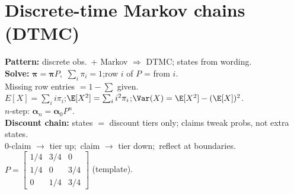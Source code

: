 \section*{Discrete-time Markov chains (DTMC)}
\textbf{Pattern:} discrete obs.\ + Markov $\Rightarrow$ DTMC; states from wording.\\
\textbf{Solve:} $\boldsymbol{\pi}=\boldsymbol{\pi}P$,\ $\sum_i\pi_i=1$;\quad row $i$ of $P$ = from $i$.\\
Missing row entries $=1-\sum$ given.\\
$E[X]=\sum_i i\pi_i$;\quad $\E[X^2]=\sum_i i^2\pi_i$;\quad $\Var(X)=\E[X^2]-(\E[X])^2$.\\
$n$-step: $\boldsymbol{\alpha}_n=\boldsymbol{\alpha}_0 P^n$.\\
\textbf{Discount chain:} states $=$ discount tiers only; claims tweak probs, not extra states.\\
0-claim $\to$ tier up;\ claim $\to$ tier down;\ reflect at boundaries.\\
$P=\begin{bmatrix}1/4&3/4&0\\[2pt]1/4&0&3/4\\[2pt]0&1/4&3/4\end{bmatrix}$ (template).
